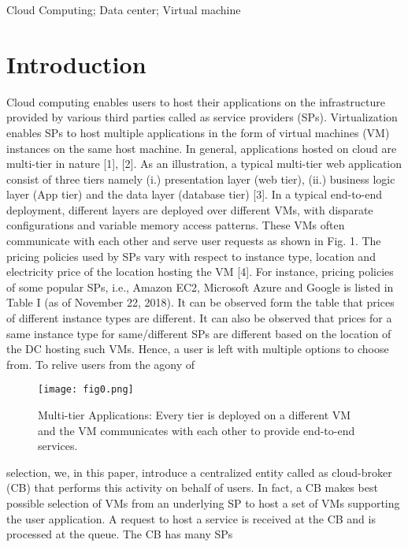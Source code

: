 \documentclass[conference]{IEEEtran}
\newcommand\tab[1][0.8cm]{\hspace*{#1}}
\begin{document}
\begin{IEEEkeywords}
Cloud Computing; Data center; Virtual machine
\end{IEEEkeywords}

\section{Introduction}

\tab Cloud computing enables users to host their applications
on the infrastructure provided by various third parties called
as service providers (SPs). Virtualization enables SPs to host
multiple applications in the form of virtual machines (VM)
instances on the same host machine. In general, applications
hosted on cloud are multi-tier in nature [1], [2]. As an
illustration, a typical multi-tier web application consist of three
tiers namely (i.) presentation layer (web tier), (ii.) business
logic layer (App tier) and the data layer (database tier) [3]. In
a typical end-to-end deployment, different layers are deployed
over different VMs, with disparate configurations and variable
memory access patterns. These VMs often communicate with
each other and serve user requests as shown in Fig. 1.\newline
\tab
The pricing policies used by SPs vary with respect to
instance type, location and electricity price of the location
hosting the VM [4]. For instance, pricing policies of some
popular SPs, i.e., Amazon EC2, Microsoft Azure and Google
is listed in Table I (as of November 22, 2018). It can be
observed form the table that prices of different instance types
are different. It can also be observed that prices for a same
instance type for same/different SPs are different based on the
location of the DC hosting such VMs. Hence, a user is left
with multiple options to choose from. To relive users from the agony of 
\begin{figure}[htbp]
	\centerline{\texttt{[image: fig0.png]}}
	\caption{Multi-tier Applications: Every tier is deployed on a different VM and
		the VM communicates with each other to provide end-to-end services.}
	\label{fig}
\end{figure}
selection, we, in this paper, introduce a centralized
entity called as cloud-broker (CB) that performs this activity
on behalf of users. In fact, a CB makes best possible selection
of VMs from an underlying SP to host a set of VMs supporting
the user application. A request to host a service is received at
the CB and is processed at the queue. The CB has many SPs
\end{document}
